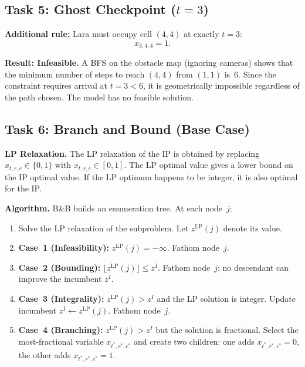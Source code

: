 \documentclass[12pt,a4paper]{article}
\begin{document}
\subsection*{Task 5: Ghost Checkpoint ($t=3$)}

\textbf{Additional rule:} Lara must occupy cell $(4,4)$ at exactly $t=3$:
\[
  x_{3,4,4}=1.
\]

\textbf{Result: Infeasible.} A BFS on the obstacle map (ignoring cameras) shows that the
minimum number of steps to reach $(4,4)$ from $(1,1)$ is~6. Since the constraint requires
arrival at $t=3<6$, it is geometrically impossible regardless of the path chosen. The model
has no feasible solution.

\subsection*{Task 6: Branch and Bound (Base Case)}

\textbf{LP Relaxation.}
The LP relaxation of the IP is obtained by replacing $x_{t,r,c}\in\{0,1\}$ with
$x_{t,r,c}\in[0,1]$. The LP optimal value gives a lower bound on the IP optimal value. If
the LP optimum happens to be integer, it is also optimal for the IP.

\textbf{Algorithm.}
B\&B builds an enumeration tree. At each node~$j$:

\begin{enumerate}
  \item Solve the LP relaxation of the subproblem. Let $z^{\mathrm{LP}}(j)$ denote its value.
  \item \textbf{Case~1 (Infeasibility):} $z^{\mathrm{LP}}(j)=-\infty$. Fathom node~$j$.
  \item \textbf{Case~2 (Bounding):} $\lfloor z^{\mathrm{LP}}(j)\rfloor \leq z^I$. Fathom
        node~$j$; no descendant can improve the incumbent $z^I$.
  \item \textbf{Case~3 (Integrality):} $z^{\mathrm{LP}}(j)>z^I$ and the LP solution is
        integer. Update incumbent $z^I\leftarrow z^{\mathrm{LP}}(j)$. Fathom node~$j$.
  \item \textbf{Case~4 (Branching):} $z^{\mathrm{LP}}(j)>z^I$ but the solution is
        fractional. Select the most-fractional variable $x_{t^*,r^*,c^*}$ and create two
        children: one adds $x_{t^*,r^*,c^*}=0$, the other adds $x_{t^*,r^*,c^*}=1$.
\end{enumerate}
\end{document}
